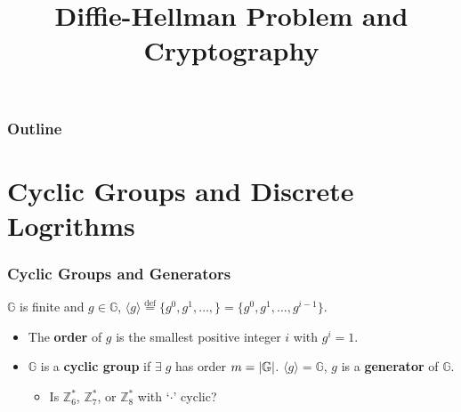 

\title{Diffie-Hellman Problem and Cryptography}


\maketitle
\begin{frame}
\frametitle{Outline}
\tableofcontents
\end{frame}
\section{Cyclic Groups and Discrete Logrithms}
\begin{frame}\frametitle{Cyclic Groups and Generators}
$\mathbb{G}$ is finite and $g \in \mathbb{G}$, 
$ \langle g \rangle \overset{\text{def}}{=} \{ g^0,g^1,\dotsc,\} = \{ g^0,g^1,\dotsc, g^{i-1}\}. $
\begin{itemize}
\item The \textbf{order} of $g$ is the smallest positive integer $i$ with $g^i=1$.
\item $\mathbb{G}$ is a \textbf{cyclic group} if $\exists\;g$ has order $m = \lvert\mathbb{G}\rvert$. $\langle g \rangle = \mathbb{G}$, $g$ is a \textbf{generator} of $\mathbb{G}$.
\begin{exampleblock}{}
\begin{itemize}
\item Is $\mathbb{Z}_6^*$, $\mathbb{Z}_7^*$, or $\mathbb{Z}_8^*$ with `$\cdot$' cyclic? %
\end{itemize}
\end{exampleblock}
\end{itemize}
\end{frame}
%

